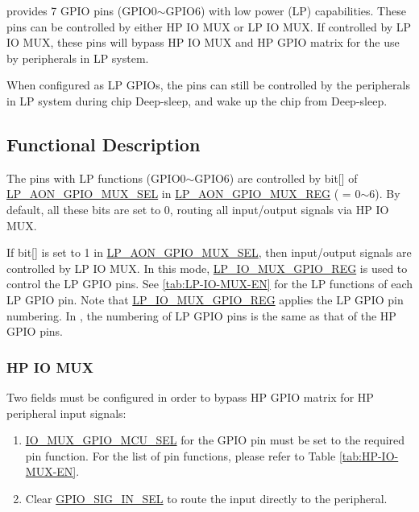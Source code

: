 \documentclass[main\_\_EN.tex]{subfiles}
\begin{document}
\chipname{} provides 7 GPIO pins (GPIO0$\sim$GPIO6) with low power (LP) capabilities. These pins can be controlled by either HP IO MUX or LP IO MUX. If controlled by LP IO MUX, these pins will bypass HP IO MUX and HP GPIO matrix for the use by peripherals in LP system.

When configured as LP GPIOs, the pins can still be controlled by the peripherals in LP system during chip Deep-sleep, and wake up the chip from Deep-sleep.

\subsection{Functional Description}

The pins with LP functions (GPIO0$\sim$GPIO6) are controlled by bit[] of \hyperref[fielddesc:LPAONGPIOMUXSEL]{LP\_AON\_GPIO\_MUX\_SEL} in \hyperref[regdesc:LPAONGPIOMUXREG]{LP\_AON\_GPIO\_MUX\_REG} ( = 0$\sim$6). By default, all these bits are set to 0, routing all input/output signals via HP IO MUX.

If bit[] is set to 1 in \hyperref[fielddesc:LPAONGPIOMUXSEL]{LP\_AON\_GPIO\_MUX\_SEL}, then input/output signals are controlled by LP IO MUX. In this mode, \hyperref[regdesc:LPIOMUXGPIONREG]{LP\_IO\_MUX\_GPIO\_REG} is used to control the LP GPIO pins. See \ref{tab:LP-IO-MUX-EN} for the LP functions of each LP GPIO pin. Note that \hyperref[regdesc:LPIOMUXGPIONREG]{LP\_IO\_MUX\_GPIO\_REG} applies the LP GPIO pin numbering. In \chipname{}, the numbering of LP GPIO pins is the same as that of the HP GPIO pins.

\subsubsection{HP IO MUX}
Two fields must be configured in order to bypass HP GPIO matrix for HP peripheral input signals:

\begin{enumerate}
\item \hyperref[fielddesc:IOMUXGPIONMCUSEL]{IO\_MUX\_GPIO\_MCU\_SEL} for the GPIO pin must be set to the required pin function. For the list of pin functions, please refer to Table \ref{tab:HP-IO-MUX-EN}.
\item Clear \hyperref[fielddesc:GPIOSIGNINSEL]{GPIO\_SIG\_IN\_SEL} to route the input directly to the peripheral.
\end{enumerate}
\end{document}
